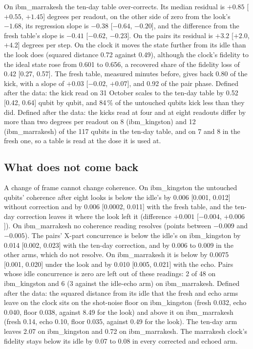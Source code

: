 \documentclass[reprint,amsmath,amssymb,aps,superscriptaddress,nofootinbib]{revtex4-2}
\begin{document}
On ibm\_marrakesh the ten-day table over-corrects. Its median residual is $+0.85$ [$+0.55$, $+1.45$] degrees per readout, on the other side of zero from the look's $-1.68$, its regression slope is $-0.38$ [$-0.64$, $-0.20$], and the difference from the fresh table's slope is $-0.41$ [$-0.62$, $-0.23$]. On the pairs its residual is $+3.2$ [$+2.0$, $+4.2$] degrees per step. On the clock it moves the state further from its idle than the look does (squared distance 0.72 against 0.49), although the clock's fidelity to the ideal state rose from 0.601 to 0.656, a recovered share of the fidelity loss of 0.42 [0.27, 0.57]. The fresh table, measured minutes before, gives back 0.80 of the kick, with a slope of $+0.03$ [$-0.02$, $+0.07$], and 0.92 of the pair phase. Defined after the data: the kick read on 31 October scales to the ten-day table by 0.52 [0.42, 0.64] qubit by qubit, and 84\,\% of the untouched qubits kick less than they did. Defined after the data: the kicks read at four and at eight readouts differ by more than two degrees per readout on 8 (ibm\_kingston) and 12 (ibm\_marrakesh) of the 117 qubits in the ten-day table, and on 7 and 8 in the fresh one, so a table is read at the dose it is used at.

\subsection{What does not come back}
A change of frame cannot change coherence. On ibm\_kingston the untouched qubits' coherence after eight looks is below the idle's by 0.006 [0.001, 0.012] without correction and by 0.006 [0.0002, 0.011] with the fresh table, and the ten-day correction leaves it where the look left it (difference $+0.001$ [$-0.004$, $+0.006$]). On ibm\_marrakesh no coherence reading resolves (points between $-0.009$ and $-0.005$). The pairs' X-part concurrence is below the idle's on ibm\_kingston by 0.014 [0.002, 0.023] with the ten-day correction, and by 0.006 to 0.009 in the other arms, which do not resolve. On ibm\_marrakesh it is below by 0.0075 [0.001, 0.020] under the look and by 0.010 [0.005, 0.021] with the echo. Pairs whose idle concurrence is zero are left out of these readings: 2 of 48 on ibm\_kingston and 6 (3 against the idle-echo arm) on ibm\_marrakesh. Defined after the data: the squared distance from its idle that the fresh and echo arms leave on the clock sits on the shot-noise floor on ibm\_kingston (fresh 0.032, echo 0.040, floor 0.038, against 8.49 for the look) and above it on ibm\_marrakesh (fresh 0.14, echo 0.10, floor 0.035, against 0.49 for the look). The ten-day arm leaves 2.07 on ibm\_kingston and 0.72 on ibm\_marrakesh. The marrakesh clock's fidelity stays below its idle by 0.07 to 0.08 in every corrected and echoed arm.
\end{document}
